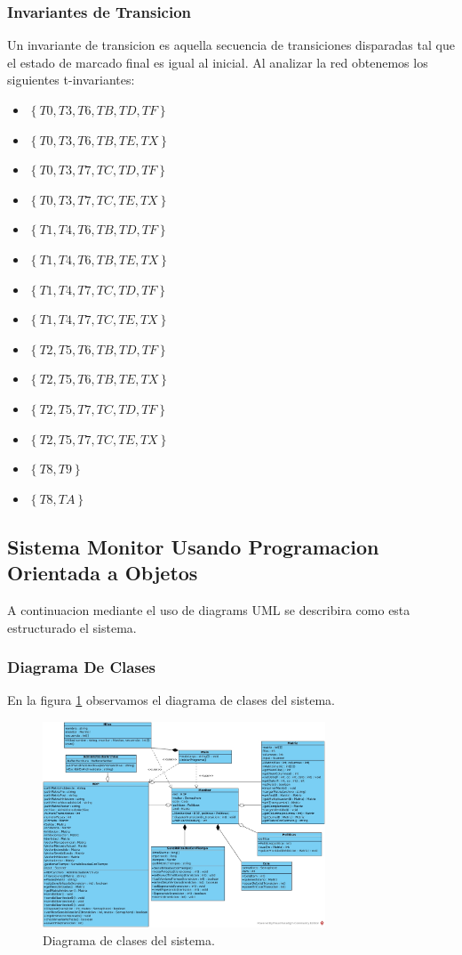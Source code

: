\documentclass{article}
\begin{document}
		\subsubsection{Invariantes de Transicion}
		Un invariante de transicion es aquella secuencia de transiciones disparadas tal que el estado de marcado final es igual al inicial. Al analizar la red obtenemos los siguientes t-invariantes:
		\begin{itemize}
		\item $\left\lbrace T0,T3,T6,TB,TD,TF \right\rbrace$
		\item $\left\lbrace T0,T3,T6,TB,TE,TX \right\rbrace$
		\item $\left\lbrace T0,T3,T7,TC,TD,TF \right\rbrace$
		\item $\left\lbrace T0,T3,T7,TC,TE,TX \right\rbrace$
		\item $\left\lbrace T1,T4,T6,TB,TD,TF \right\rbrace$
		\item $\left\lbrace T1,T4,T6,TB,TE,TX \right\rbrace$
		\item $\left\lbrace T1,T4,T7,TC,TD,TF \right\rbrace$
		\item $\left\lbrace T1,T4,T7,TC,TE,TX \right\rbrace$
		\item $\left\lbrace T2,T5,T6,TB,TD,TF \right\rbrace$
		\item $\left\lbrace T2,T5,T6,TB,TE,TX \right\rbrace$
		\item $\left\lbrace T2,T5,T7,TC,TD,TF \right\rbrace$
		\item $\left\lbrace T2,T5,T7,TC,TE,TX \right\rbrace$
		\item $\left\lbrace T8,T9 \right\rbrace$
		\item $\left\lbrace T8,TA \right\rbrace$
		\end{itemize}
	\subsection{Sistema Monitor Usando Programacion Orientada a Objetos}
	A continuacion mediante el uso de diagrams UML se describira como esta estructurado el sistema.
		\subsubsection{Diagrama De Clases}
		En la figura \ref{fig:mesh2} observamos el diagrama de clases del sistema.
		\begin{figure}[H]
			\centering
			\includegraphics[width=0.75\textwidth]{Diagrama_de_Clase}
			\caption{Diagrama de clases del sistema.}
			\label{fig:mesh2}
		\end{figure}
\end{document}

